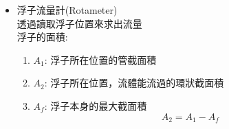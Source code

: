 \documentclass[../main.tex]{subfiles}
\begin{document}
\begin{itemize}
\begin{itemize}
\begin{equation}
      \dot m = \boxed{\rho C_C A_0 \sqrt{\frac{\frac{2g_c}{\rho}\left(
        P_1 - P_2
      \right)}{\alpha_2 \left[
        1 - \boxed{\frac{\alpha_1 C_C^2}{\alpha_2}} \left(
          \frac{A_0}{A_1}
        \right)^2
      \right]}}}
    \end{equation}
    然後因為這樣經驗值太多了，因此以$C_D$來代替\\
    稱為$C_D$ (Coefficient of Discharge)，去掉所有經驗值，把$C_C\to C_D$
    \begin{equation}
      \boxed{
        \dot m = \rho C_D A_0 \sqrt{\frac{\frac{2g_c}{\rho}\left(
          P_1 - P_2
        \right)}{ \left[
          1 - \left(
            \frac{A_0}{A_1}
          \right)^2
        \right]}}}
    \end{equation}
    而題目有可能只給流量計的高度差，則必須將高度差換成壓力差
    \begin{equation}
      P_1 - P_2 = \left(
        \rho^\ast - \rho 
      \right)\frac{g}{g_c} \Delta h
    \end{equation}
    其中$\rho^\ast$為流量計內充填液體的密度\\
    代入上式可得
    \begin{equation}
        \dot m = \rho C_D A_0 \sqrt{\frac{\boxed{ \left(
          \frac{\rho^\ast - \rho}{\rho}
        \right)}2 g \Delta h}{\rho \left[
          1 - \left(
            \frac{A_0}{A_1}
          \right)^2
        \right]}}
    \end{equation}
    還有流量計內的液體已經換算成流體的高度差，例如水柱高度差\\
    那就直接代進去$h$即可
    \begin{equation}
        \dot m = \rho C_D A_0 \sqrt{\frac{ 2 g \boxed{h_o}}{\rho \left[
          1 - \left(
            \frac{A_0}{A_1}
          \right)^2
        \right]}}
    \end{equation}
    \item 浮子流量計(Rotameter)\\
    透過讀取浮子位置來求出流量\\
    浮子的面積:
    \begin{enumerate}
      \item $A_1$: 浮子所在位置的管截面積
      \item $A_2$: 浮子所在位置，流體能流過的環狀截面積
      \item $A_f$: 浮子本身的最大截面積
      \begin{equation}
        A_2 = A_1 - A_f
      \end{equation}
    \end{enumerate}

\end{itemize}
\end{itemize}
\end{document}
